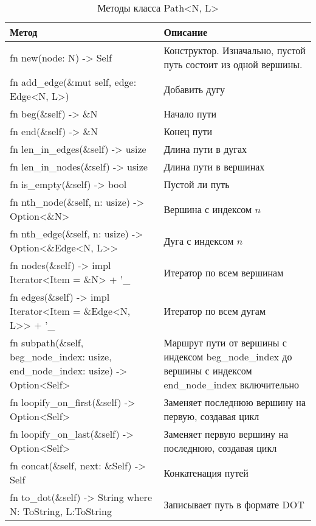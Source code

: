 \begin{table}
    \caption{Методы класса Path<N, L>}
    \label{class_PathNL_api}
    \begin{tabular}{|m{20em}|m{20em}|}
        \hline
        \textbf{Метод} & \textbf{Описание}\\
        \hline
            fn new(node: N) -> Self & Конструктор. Изначально, пустой путь состоит из одной вершины. \\
        \hline
            fn add\_edge(\&mut self, edge: Edge<N, L>) & Добавить дугу \\
        \hline
            fn beg(\&self) -> \&N & Начало пути \\
        \hline
            fn end(\&self) -> \&N & Конец пути \\
        \hline
            fn len\_in\_edges(\&self) -> usize & Длина пути в дугах \\
        \hline
            fn len\_in\_nodes(\&self) -> usize & Длина пути в вершинах \\
        \hline
            fn is\_empty(\&self) -> bool & Пустой ли путь \\
        \hline
            fn nth\_node(\&self, n: usize) -> Option<\&N> & Вершина с индексом $n$ \\
        \hline
            fn nth\_edge(\&self, n: usize) -> Option<\&Edge<N, L>{}> & Дуга с индексом $n$ \\
        \hline
            fn nodes(\&self) -> impl Iterator<Item = \&N> + '\_ & Итератор по всем вершинам \\
        \hline
            fn edges(\&self) -> impl Iterator<Item = \&Edge<N, L>{}> + '\_ & Итератор по всем дугам \\
        \hline
            fn subpath(\&self, beg\_node\_index: usize, end\_node\_index: usize) -> Option<Self> & Маршрут пути от вершины с индексом beg\_node\_index до вершины с индексом end\_node\_index включительно \\
        \hline
            fn loopify\_on\_first(\&self) -> Option<Self> & Заменяет последнюю вершину на первую, создавая цикл \\
        \hline
            fn loopify\_on\_last(\&self) -> Option<Self> & Заменяет первую вершину на последнюю, создавая цикл \\
        \hline
            fn concat(\&self, next: \&Self) -> Self & Конкатенация путей \\
        \hline
            fn to\_dot(\&self) -> String \newline where N: ToString, L:ToString & Записывает путь в формате DOT \\
        \hline
    \end{tabular}
\end{table}

